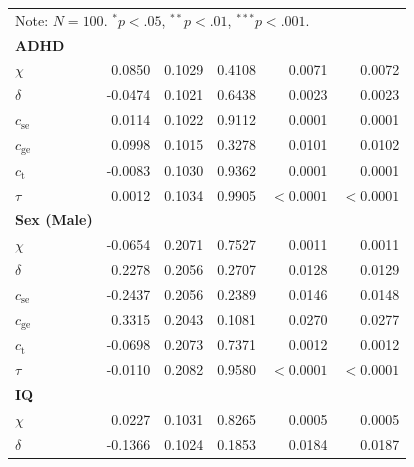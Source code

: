 \begin{longtable}{l r r r r r}
        \bottomrule
       \multicolumn{6}{l}{\footnotesize \rule{0pt}{3ex}Note: $N=100$. $^* p<.05$, $^{**} p<.01$, $^{***} p<.001$.} \\
        \endlastfoot
        \textbf{ADHD} & & & & & \\
        \hspace{4mm} $\chi$ & 0.0850 & 0.1029 & 0.4108 & 0.0071 & 0.0072 \\
        \hspace{4mm} $\delta$ & -0.0474 & 0.1021 & 0.6438 & 0.0023 & 0.0023 \\
        \hspace{4mm} $c_{\text{se}}$ & 0.0114 & 0.1022 & 0.9112 & 0.0001 & 0.0001 \\
        \hspace{4mm} $c_{\text{ge}}$ & 0.0998 & 0.1015 & 0.3278 & 0.0101 & 0.0102 \\
        \hspace{4mm} $c_{\text{t}}$ & -0.0083 & 0.1030 & 0.9362 & 0.0001 & 0.0001 \\
        \hspace{4mm} $\tau$ & 0.0012 & 0.1034 & 0.9905 & $<0.0001$ & $<0.0001$ \\
        \midrule
        \textbf{Sex (Male)} & & & & & \\
        \hspace{4mm} $\chi$ & -0.0654 & 0.2071 & 0.7527 & 0.0011 & 0.0011 \\
        \hspace{4mm} $\delta$ & 0.2278 & 0.2056 & 0.2707 & 0.0128 & 0.0129 \\
        \hspace{4mm} $c_{\text{se}}$ & -0.2437 & 0.2056 & 0.2389 & 0.0146 & 0.0148 \\
        \hspace{4mm} $c_{\text{ge}}$ & 0.3315 & 0.2043 & 0.1081 & 0.0270 & 0.0277 \\
        \hspace{4mm} $c_{\text{t}}$ & -0.0698 & 0.2073 & 0.7371 & 0.0012 & 0.0012 \\
        \hspace{4mm} $\tau$ & -0.0110 & 0.2082 & 0.9580 & $<0.0001$ & $<0.0001$ \\
        \midrule
        \textbf{IQ} & & & & & \\
        \hspace{4mm} $\chi$ & 0.0227 & 0.1031 & 0.8265 & 0.0005 & 0.0005 \\
        \hspace{4mm} $\delta$ & -0.1366 & 0.1024 & 0.1853 & 0.0184 & 0.0187 \\

\end{longtable}
